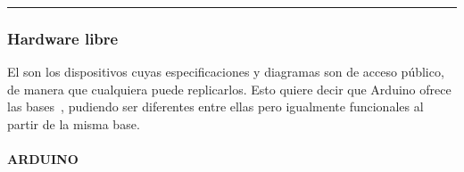 \documentclass[letterpaper,10pt,spanish]{sphinxmanual}
\begin{document}
\bigskip\hrule\bigskip



\subsubsection{Hardware libre}
\label{\detokenize{1_guias/10informatica/G1004:hardware-libre}}
\sphinxAtStartPar
El  son los dispositivos cuyas especificaciones y diagramas son de acceso público, de manera que cualquiera puede replicarlos. Esto quiere decir que Arduino ofrece las bases , pudiendo ser diferentes entre ellas pero igualmente funcionales al partir de la misma base.


\paragraph{ARDUINO}
\label{\detokenize{1_guias/10informatica/G1004:arduino}}
\end{document}

